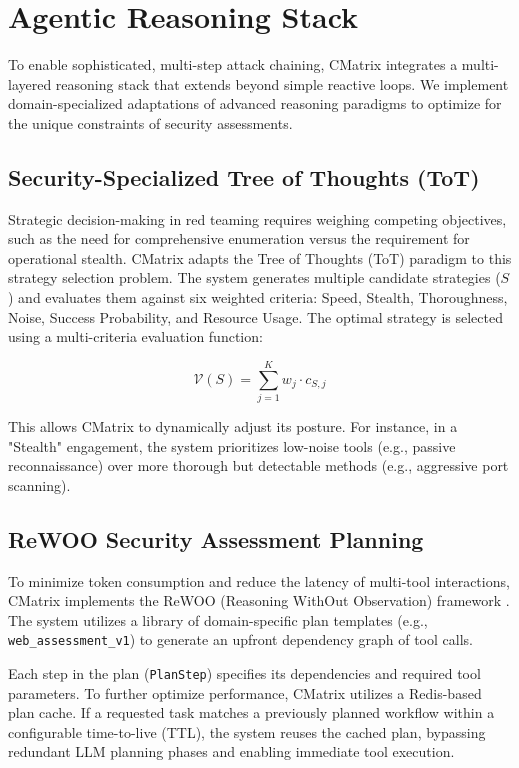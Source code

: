 \documentclass[conference,compsoc]{IEEEtran}
\begin{document}
\section{Agentic Reasoning Stack} \label{sec:reasoning}
To enable sophisticated, multi-step attack chaining, CMatrix integrates a multi-layered reasoning stack that extends beyond simple reactive loops. We implement domain-specialized adaptations of advanced reasoning paradigms to optimize for the unique constraints of security assessments.

\subsection{Security-Specialized Tree of Thoughts (ToT)}
Strategic decision-making in red teaming requires weighing competing objectives, such as the need for comprehensive enumeration versus the requirement for operational stealth. CMatrix adapts the Tree of Thoughts (ToT) \cite{tot} paradigm to this strategy selection problem. The system generates multiple candidate strategies ($S$) and evaluates them against six weighted criteria: Speed, Stealth, Thoroughness, Noise, Success Probability, and Resource Usage. The optimal strategy is selected using a multi-criteria evaluation function:

\begin{equation}
\mathcal{V}(S) = \sum_{j=1}^{K} w_j \cdot c_{S,j}
\end{equation}

This allows CMatrix to dynamically adjust its posture. For instance, in a "Stealth" engagement, the system prioritizes low-noise tools (e.g., passive reconnaissance) over more thorough but detectable methods (e.g., aggressive port scanning).

\subsection{ReWOO Security Assessment Planning}
To minimize token consumption and reduce the latency of multi-tool interactions, CMatrix implements the ReWOO (Reasoning WithOut Observation) framework \cite{rewoo}. The system utilizes a library of domain-specific plan templates (e.g., \texttt{web\_assessment\_v1}) to generate an upfront dependency graph of tool calls.

Each step in the plan (\texttt{PlanStep}) specifies its dependencies and required tool parameters. To further optimize performance, CMatrix utilizes a Redis-based plan cache. If a requested task matches a previously planned workflow within a configurable time-to-live (TTL), the system reuses the cached plan, bypassing redundant LLM planning phases and enabling immediate tool execution.
\end{document}
